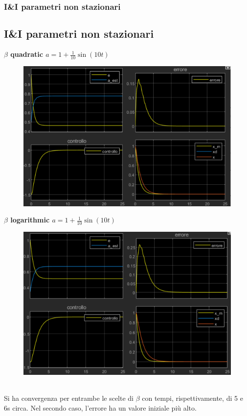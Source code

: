 \documentclass{beamer}
\begin{document}
\begin{frame}
	\frametitle{I\&I parametri non stazionari}
	\subsection{I\&I parametri non stazionari}
	\begin{minipage}[t]{0.45\textwidth}
		\textbf{\(\beta\) quadratic \( a=1+\frac{1}{10}\sin{(10t)}\)}
		\begin{figure}
			\includegraphics[scale=0.35]{2022-05-21-10-38-05.png} %
		\end{figure}
	\end{minipage}
	\begin{minipage}[t]{0.45\textwidth}
		\textbf{\(\beta\) logarithmic \( a=1+\frac{1}{10}\sin{(10t)}\)}
		\begin{figure}
			\includegraphics[scale=0.35]{2022-05-21-10-39-00.png} %
		\end{figure}
	\end{minipage}
	\vspace{0.1cm}\\
	Si ha convergenza per entrambe le scelte di \(\beta\) con tempi, rispettivamente, di 5 e 6s circa. Nel secondo caso, l'errore ha un valore iniziale più alto.
\end{frame}
\end{document}
